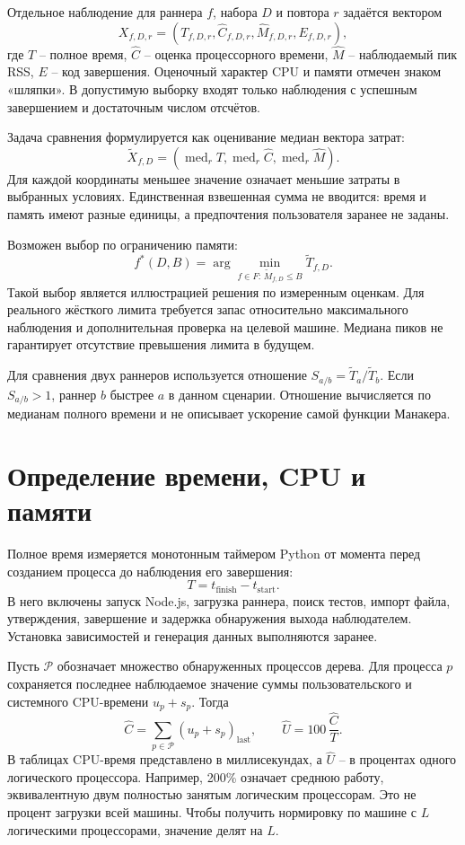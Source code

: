 Отдельное наблюдение для раннера $f$, набора $D$ и повтора $r$ задаётся вектором
\[
 X_{f,D,r}=(T_{f,D,r},\widehat C_{f,D,r},
 \widehat M_{f,D,r},E_{f,D,r}),
\]
где $T$ -- полное время, $\widehat C$ -- оценка процессорного времени, $\widehat M$ -- наблюдаемый пик RSS, $E$ -- код завершения. Оценочный характер CPU и памяти отмечен знаком «шляпки». В допустимую выборку входят только наблюдения с успешным завершением и достаточным числом отсчётов.

Задача сравнения формулируется как оценивание медиан вектора затрат:
\[
 \widetilde X_{f,D}
 =(\operatorname{med}_r T,\operatorname{med}_r\widehat C,
   \operatorname{med}_r\widehat M).
\]
Для каждой координаты меньшее значение означает меньшие затраты в выбранных условиях. Единственная взвешенная сумма не вводится: время и память имеют разные единицы, а предпочтения пользователя заранее не заданы.

Возможен выбор по ограничению памяти:
\[
 f^*(D,B)=\arg\min_{f\in F:\,\widetilde M_{f,D}\le B}
                   \widetilde T_{f,D}.
\]
Такой выбор является иллюстрацией решения по измеренным оценкам. Для реального жёсткого лимита требуется запас относительно максимального наблюдения и дополнительная проверка на целевой машине. Медиана пиков не гарантирует отсутствие превышения лимита в будущем.

Для сравнения двух раннеров используется отношение
$S_{a/b}=\widetilde T_a/\widetilde T_b$. Если $S_{a/b}>1$, раннер $b$ быстрее $a$ в данном сценарии. Отношение вычисляется по медианам полного времени и не описывает ускорение самой функции Манакера.

\section{Определение времени, CPU и памяти}
Полное время измеряется монотонным таймером Python от момента перед созданием процесса до наблюдения его завершения:
\[
 T=t_{\mathrm{finish}}-t_{\mathrm{start}}.
\]
В него включены запуск Node.js, загрузка раннера, поиск тестов, импорт файла, утверждения, завершение и задержка обнаружения выхода наблюдателем. Установка зависимостей и генерация данных выполняются заранее.

Пусть $\mathcal P$ обозначает множество обнаруженных процессов дерева. Для процесса $p$ сохраняется последнее наблюдаемое значение суммы пользовательского и системного CPU-времени $u_p+s_p$. Тогда
\[
 \widehat C=\sum_{p\in\mathcal P}(u_p+s_p)_{\mathrm{last}},
 \qquad
 \widehat U=100\,\frac{\widehat C}{T}.
\]
В таблицах CPU-время представлено в миллисекундах, а $\widehat U$ -- в процентах одного логического процессора. Например, 200\% означает среднюю работу, эквивалентную двум полностью занятым логическим процессорам. Это не процент загрузки всей машины. Чтобы получить нормировку по машине с $L$ логическими процессорами, значение делят на $L$.

